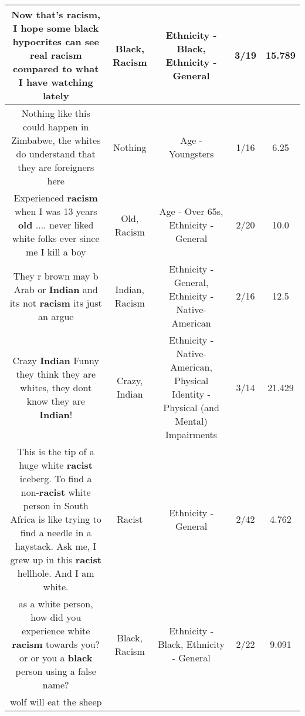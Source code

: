 \documentclass[11pt]{article}
\newlength\mylength
\begin{document}
\begin{center}
\begin{longtable}{|C{.65\mylength}|C{.30\mylength}|C{.12\mylength}|C{.12\mylength}|C{.12\mylength}|}
  \small Now that's \textbf{racism}, I hope some \textbf{black} hypocrites can see real \textbf{racism} compared to what I have watching lately\normalsize   & Black, Racism & Ethnicity - Black, Ethnicity - General & 3/19 & 15.789 \\  \hline
  \small Nothing like this could happen in Zimbabwe, the whites do understand that they are foreigners here\normalsize   & Nothing & Age - Youngsters & 1/16 & 6.25 \\  \hline
  \small Experienced \textbf{racism} when I was 13 years \textbf{old} .... never liked white folks ever since me I kill a boy\normalsize   & Old, Racism & Age - Over 65s, Ethnicity - General & 2/20 & 10.0 \\  \hline
  \small They r brown may b Arab or \textbf{Indian} and its not \textbf{racism} its just an argue\normalsize   & Indian, Racism & Ethnicity - General, Ethnicity - Native-American & 2/16 & 12.5 \\  \hline
  \small Crazy \textbf{Indian} Funny they think they are whites, they dont know they are \textbf{Indian}!\normalsize   & Crazy, Indian & Ethnicity - Native-American, Physical Identity - Physical (and Mental) Impairments & 3/14 & 21.429 \\  \hline
  \small This is the tip of a huge white \textbf{racist} iceberg. To find a non-\textbf{racist} white person in South Africa is like trying to find a needle in a haystack. Ask me, I grew up in this \textbf{racist} hellhole. And I am white.\normalsize   & Racist & Ethnicity - General & 2/42 & 4.762 \\  \hline
  \small as a white person, how did you experience white \textbf{racism} towards you? or or you a \textbf{black} person using a false name?\normalsize   & Black, Racism & Ethnicity - Black, Ethnicity - General & 2/22 & 9.091 \\  \hline
  \small wolf will eat the sheep

\end{longtable}
\end{center}
\end{document}
